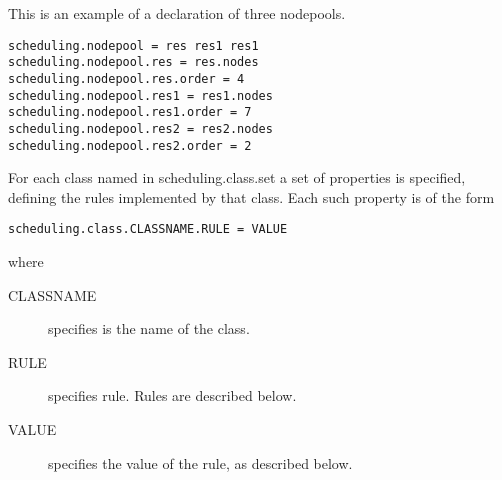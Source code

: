     This is an example of a declaration of three nodepools. 

\begin{verbatim}
scheduling.nodepool = res res1 res1 
scheduling.nodepool.res = res.nodes 
scheduling.nodepool.res.order = 4 
scheduling.nodepool.res1 = res1.nodes 
scheduling.nodepool.res1.order = 7 
scheduling.nodepool.res2 = res2.nodes 
scheduling.nodepool.res2.order = 2 
\end{verbatim}
    
    For each class named in scheduling.class.set a set of properties is specified, defining the rules 
    implemented by that class. Each such property is of the form 

\begin{verbatim}
scheduling.class.CLASSNAME.RULE = VALUE 
\end{verbatim}
    
    where 
    \begin{description}
      \item[CLASSNAME] specifies is the name of the class. 
      \item[RULE] specifies rule. Rules are described below. 
      \item[VALUE] specifies the value of the rule, as described below. 
      \end{description}
      
